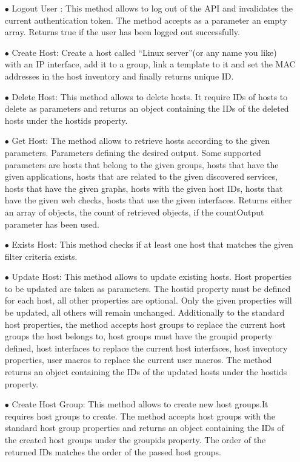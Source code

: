 \documentclass{article}
\begin{document}
\begin{itemize}
\item[$\bullet$] Logout User : This method allows to log out of the API and invalidates the current authentication token. The method accepts as a parameter an empty array. Returns true if the user has been logged out successfully.

\item[$\bullet$]Create Host: Create a host called “Linux server”(or any name you like) with an IP interface, add it to a group, link a template to it and set the MAC addresses in the host inventory and finally returns unique ID.

\item[$\bullet$]Delete Host: This method allows to delete hosts. It require IDs of hosts to delete as parameters  and returns an object containing the IDs of the deleted hosts under the hostids property.

\item[$\bullet$]Get Host: The method allows to retrieve hosts according to the given parameters.  Parameters defining the desired output. Some supported parameters are hosts that belong to the given groups, hosts that have the given applications, hosts that are related to the given discovered services, hosts that have the given graphs, hosts with the given host IDs, hosts that have the given web checks, hosts that use the given interfaces. Returns either an array of objects, the count of retrieved objects, if the countOutput parameter has been used.

\item[$\bullet$]Exists Host: This method checks if at least one host that matches the given filter criteria exists.

\item[$\bullet$]Update Host: This method allows to update existing hosts. Host properties to be updated are taken as parameters. The hostid property must be defined for each host, all other properties are optional. Only the given properties will be updated, all others will remain unchanged. Additionally to the standard host properties, the method accepts host groups to replace the current host groups the host belongs to, host groups must have the groupid property defined, host interfaces to replace the current host interfaces, host inventory properties, user macros to replace the current user macros. The method returns an object containing the IDs of the updated hosts under the hostids property.

\item[$\bullet$]Create Host Group:  This method allows to create new host groups.It requires host groups to create. The method accepts host groups with the standard host group properties and returns an object containing the IDs of the created host groups under the groupids property. The order of the returned IDs matches the order of the passed host groups.


\end{itemize}
\end{document}
